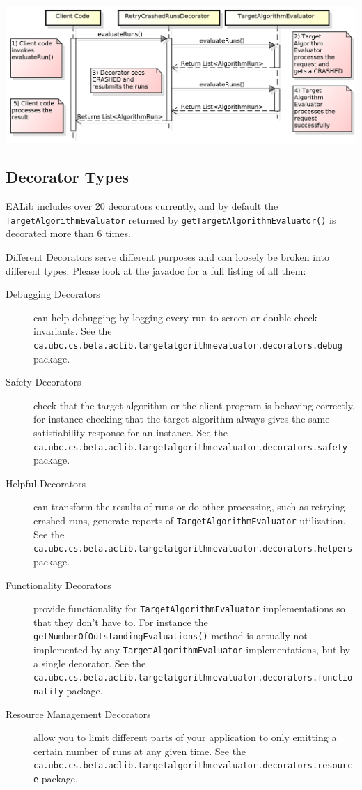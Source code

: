 \documentclass[11pt,letterpaper,oneside]{article}
\begin{document}
\begin{center}
\includegraphics[scale=0.75]{img/UML/TAEDecoration.png}
\end{center}


\subsection{Decorator Types}

EALib includes over 20 decorators currently, and by default the \texttt{TargetAlgorithmEvaluator} returned by \texttt{getTargetAlgorithmEvaluator()} is decorated more than 6 times.

Different Decorators serve different purposes and can loosely be broken into different types. Please look at the javadoc for a full listing of all them:

\begin{description}
\item[Debugging Decorators] can help debugging by logging every run to screen or double check invariants. See the \texttt{ca.ubc.cs.beta.aclib.targetalgorithmevaluator.decorators.debug} package.
\item[Safety Decorators] check that the target algorithm or the client program is behaving correctly, for instance checking that the target algorithm always gives the same satisfiability response for an instance. See the\\ \texttt{ca.ubc.cs.beta.aclib.targetalgorithmevaluator.decorators.safety} package.
\item[Helpful Decorators] can transform the results of runs or do other processing, such as retrying crashed runs, generate reports of \texttt{TargetAlgorithmEvaluator} utilization. See the \\ \texttt{ca.ubc.cs.beta.aclib.targetalgorithmevaluator.decorators.helpers} package.
\item[Functionality Decorators] provide functionality for \texttt{TargetAlgorithmEvaluator} implementations so that they don't have to. For instance the \texttt{getNumberOfOutstandingEvaluations()} method is actually not implemented by any \texttt{TargetAlgorithmEvaluator} implementations, but by a single decorator. See the \\ \texttt{ca.ubc.cs.beta.aclib.targetalgorithmevaluator.decorators.functionality} package.
\item[Resource Management Decorators] allow you to limit different parts of your application to only emitting a certain number of runs at any given time. See the \\
\texttt{ca.ubc.cs.beta.aclib.targetalgorithmevaluator.decorators.resource} package.
\end{description}
\end{document}
